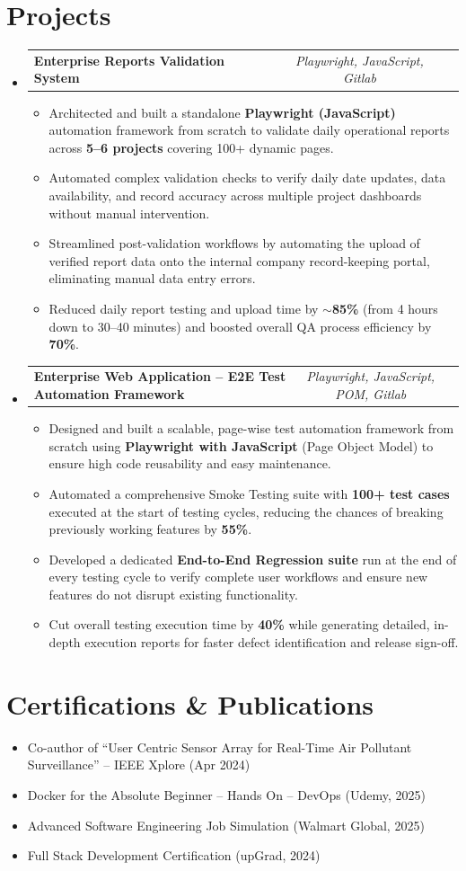 \documentclass[a4paper,11pt]{article}
\makeatletter
\newcommand{\resumeItem}[1]{
  \item\small{#1}
}
\newcommand{\resumeItemListStart}{\begin{itemize}[rightmargin=0.11in]}
\newcommand{\resumeItemListEnd}{\end{itemize}}
\newcommand{\resumeTrioHeading}[3]{
  \item\small{
    \begin{tabular*}{0.96\textwidth}[t]{
      l@{\extracolsep{\fill}}c@{\extracolsep{\fill}}r
    }
      \textbf{#1} & \textit{#2} & #3
    \end{tabular*}
  }
}
\newcommand{\resumeHeadingListStart}{
  \begin{itemize}[leftmargin=0.15in, label={}]
}
\newcommand{\resumeHeadingListEnd}{\end{itemize}}
\makeatother
\begin{document}
\section{Projects}
  \resumeHeadingListStart{}
    \resumeTrioHeading{Enterprise Reports Validation System}{Playwright, JavaScript, Gitlab}{}
      \resumeItemListStart{}
        \resumeItem{Architected and built a standalone \textbf{Playwright (JavaScript)} automation framework from scratch to validate daily operational reports across \textbf{5--6 projects} covering 100+ dynamic pages.}
        \resumeItem{Automated complex validation checks to verify daily date updates, data availability, and record accuracy across multiple project dashboards without manual intervention.}
        \resumeItem{Streamlined post-validation workflows by automating the upload of verified report data onto the internal company record-keeping portal, eliminating manual data entry errors.}
        \resumeItem{Reduced daily report testing and upload time by \textbf{$\sim$85\%} (from 4 hours down to 30--40 minutes) and boosted overall QA process efficiency by \textbf{70\%}.}
      \resumeItemListEnd{}

    \resumeTrioHeading{Enterprise Web Application – E2E Test Automation Framework}{Playwright, JavaScript, POM, Gitlab}{}
      \resumeItemListStart{}
        \resumeItem{Designed and built a scalable, page-wise test automation framework from scratch using \textbf{Playwright with JavaScript} (Page Object Model) to ensure high code reusability and easy maintenance.}
        \resumeItem{Automated a comprehensive Smoke Testing suite with \textbf{100+ test cases} executed at the start of testing cycles, reducing the chances of breaking previously working features by \textbf{55\%}.}
        \resumeItem{Developed a dedicated \textbf{End-to-End Regression suite} run at the end of every testing cycle to verify complete user workflows and ensure new features do not disrupt existing functionality.}
        \resumeItem{Cut overall testing execution time by \textbf{40\%} while generating detailed, in-depth execution reports for faster defect identification and release sign-off.}
      \resumeItemListEnd{}
  \resumeHeadingListEnd{}




\section{Certifications \& Publications}
  \resumeItemListStart{}
    \resumeItem{Co-author of ``User Centric Sensor Array for Real-Time Air Pollutant Surveillance'' -- IEEE Xplore (Apr 2024)}
    \resumeItem{Docker for the Absolute Beginner -- Hands On -- DevOps (Udemy, 2025)}
    \resumeItem{Advanced Software Engineering Job Simulation (Walmart Global, 2025)}
    \resumeItem{Full Stack Development Certification (upGrad, 2024)}
  \resumeItemListEnd{}

\end{document}
